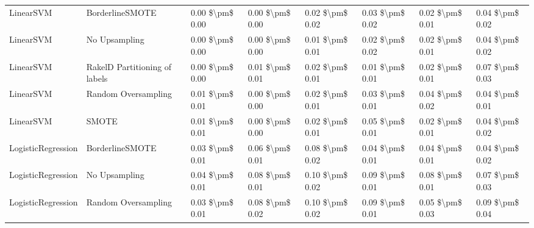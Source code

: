 \begin{tabular}{llllllll}
                      LinearSVM &               BorderlineSMOTE & 0.00 \$\textbackslash pm\$ 0.00 &           0.00 \$\textbackslash pm\$ 0.00 &       0.02 \$\textbackslash pm\$ 0.02 &        0.03 \$\textbackslash pm\$ 0.02 &                         0.02 \$\textbackslash pm\$ 0.01 &     0.04 \$\textbackslash pm\$ 0.02 \\
                      LinearSVM &                 No Upsampling & 0.00 \$\textbackslash pm\$ 0.00 &           0.00 \$\textbackslash pm\$ 0.00 &       0.01 \$\textbackslash pm\$ 0.01 &        0.02 \$\textbackslash pm\$ 0.02 &                         0.02 \$\textbackslash pm\$ 0.01 &     0.04 \$\textbackslash pm\$ 0.02 \\
                      LinearSVM & RakelD Partitioning of labels & 0.00 \$\textbackslash pm\$ 0.00 &           0.01 \$\textbackslash pm\$ 0.01 &       0.02 \$\textbackslash pm\$ 0.01 &        0.01 \$\textbackslash pm\$ 0.01 &                         0.02 \$\textbackslash pm\$ 0.01 &     0.07 \$\textbackslash pm\$ 0.03 \\
                      LinearSVM &           Random Oversampling & 0.01 \$\textbackslash pm\$ 0.01 &           0.00 \$\textbackslash pm\$ 0.00 &       0.02 \$\textbackslash pm\$ 0.01 &        0.03 \$\textbackslash pm\$ 0.01 &                         0.04 \$\textbackslash pm\$ 0.02 &     0.04 \$\textbackslash pm\$ 0.01 \\
                      LinearSVM &                         SMOTE & 0.01 \$\textbackslash pm\$ 0.01 &           0.00 \$\textbackslash pm\$ 0.00 &       0.02 \$\textbackslash pm\$ 0.01 &        0.05 \$\textbackslash pm\$ 0.01 &                         0.02 \$\textbackslash pm\$ 0.01 &     0.04 \$\textbackslash pm\$ 0.02 \\
             LogisticRegression &               BorderlineSMOTE & 0.03 \$\textbackslash pm\$ 0.01 &           0.06 \$\textbackslash pm\$ 0.01 &       0.08 \$\textbackslash pm\$ 0.02 &        0.04 \$\textbackslash pm\$ 0.01 &                         0.04 \$\textbackslash pm\$ 0.01 &     0.04 \$\textbackslash pm\$ 0.02 \\
             LogisticRegression &                 No Upsampling & 0.04 \$\textbackslash pm\$ 0.01 &           0.08 \$\textbackslash pm\$ 0.01 &       0.10 \$\textbackslash pm\$ 0.02 &        0.09 \$\textbackslash pm\$ 0.01 &                         0.08 \$\textbackslash pm\$ 0.01 &     0.07 \$\textbackslash pm\$ 0.03 \\
             LogisticRegression &           Random Oversampling & 0.03 \$\textbackslash pm\$ 0.01 &           0.08 \$\textbackslash pm\$ 0.02 &       0.10 \$\textbackslash pm\$ 0.02 &        0.09 \$\textbackslash pm\$ 0.01 &                         0.05 \$\textbackslash pm\$ 0.03 &     0.09 \$\textbackslash pm\$ 0.04 \\

\end{tabular}
